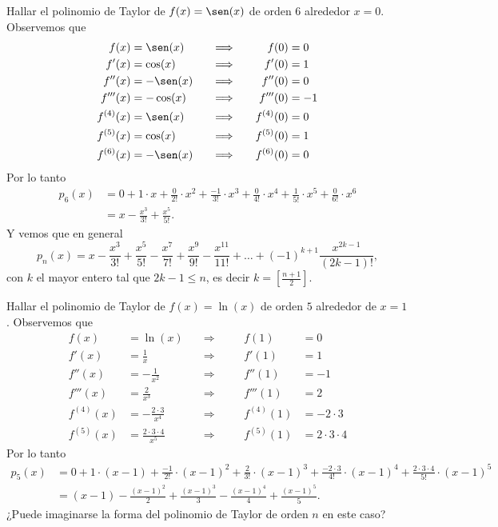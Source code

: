 \begin{ejemplo}
Hallar el polinomio de Taylor de $f(x) = \sen(x)$ de orden 6 alrededor $x=0$.
Observemos que
\[
\begin{aligned}
 f(x) &= \sen(x)  \quad &\Longrightarrow & &\quad f(0)  &= 0 \\
 f'(x) &= \cos(x) \quad &\Longrightarrow& & \quad f'(0) &= 1 \\
 f''(x) &= -\sen(x) \quad &\Longrightarrow& & \quad f''(0) &= 0 \\
 f'''(x) &= -\cos(x) \quad &\Longrightarrow& & \quad f'''(0) &= -1 \\
 f^{(4)}(x) &= \sen(x) \quad &\Longrightarrow& & \quad f^{(4)}(0) &= 0 \\
 f^{(5)}(x) &= \cos(x) \quad &\Longrightarrow& & \quad f^{(5)}(0) &= 1 \\
 f^{(6)}(x) &= -\sen(x) \quad &\Longrightarrow& & \quad f^{(6)}(0) &= 0 
\end{aligned}
\]
Por lo tanto
\begin{align*}
p_6(x) &= 0 + 1 \cdot x + \frac{0}{2!} \cdot x^2 + \frac{-1}{3!} \cdot x^3 +
          \frac{0}{4!} \cdot x^4 + \frac{1}{5!} \cdot x^5 + \frac{0}{6!} \cdot x^6 \\
       &= x - \frac{x^3}{3!} + \frac{x^5}{5!}.
\end{align*}
Y vemos que en general
\[
p_n(x) =  x - \frac{x^3}{3!} + \frac{x^5}{5!} - \frac{x^7}{7!} + \frac{x^9}{9!} - \frac{x^11}{11!} + \dots
          + (-1)^{k+1} \frac{x^{2k-1}}{(2k-1)!},
\]
con $k$ el mayor entero tal que $2k-1 \le n$, es decir $k = \left[ \frac{n+1}2 \right]$.
\end{ejemplo}

\begin{ejemplo}
 Hallar el polinomio de Taylor de $f(x) = \ln (x)$ de orden $5$ alrededor de $x=1$. 
Observemos que
\[
\begin{aligned}
 f(x) &= \ln(x)  \quad &\Longrightarrow & &\quad f(1)  &= 0 \\
 f'(x) &= \frac{1}{x} \quad &\Longrightarrow& & \quad f'(1) &= 1 \\
 f''(x) &= -\frac{1}{x^2}\quad &\Longrightarrow& & \quad f''(1) &= -1 \\
 f'''(x) &= \frac{2}{x^3} \quad &\Longrightarrow& & \quad f'''(1) &= 2 \\
 f^{(4)}(x) &= -\frac{2\cdot 3}{x^4} \quad &\Longrightarrow& & \quad f^{(4)}(1) &= -2 \cdot 3 \\
 f^{(5)}(x) &= \frac{2\cdot 3 \cdot 4}{x^5} \quad &\Longrightarrow& & \quad f^{(5)}(1) &= 2 \cdot 3\cdot 4 
\end{aligned}
\]
Por lo tanto
\begin{align*}
p_5(x) &= 0 + 1 \cdot (x-1) + \frac{-1}{2!} \cdot (x-1)^2 + \frac{2}{3!} \cdot (x-1)^3 +
          \frac{-2 \cdot 3}{4!} \cdot (x-1)^4 + \frac{2\cdot 3\cdot 4}{5!} \cdot (x-1)^5\\
       &= (x-1) - \frac{(x-1)^2}{2} + \frac{(x-1)^3}{3} - \frac{(x-1)^4}{4} + \frac{(x-1)^5}{5}.
\end{align*}
¿Puede imaginarse la forma del polinomio de Taylor de orden $n$ en este caso?
\end{ejemplo}

